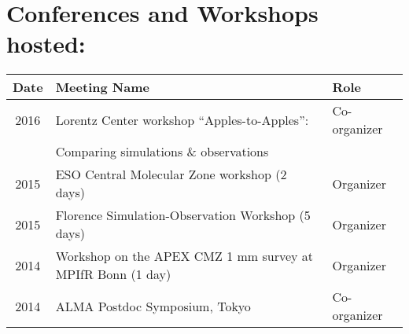 
\setlength{\extrarowheight}{0pt}
\section*{Conferences and Workshops hosted: }
\vspace{-12pt}
\begin{tabular}{cll}
    Date & Meeting Name & Role  \\
    \hline
    2016 & Lorentz Center workshop ``Apples-to-Apples'':  & Co-organizer \\
         & Comparing simulations \& observations & \\
    2015 &      ESO Central Molecular Zone workshop (2 days)   & Organizer \\
    2015 &      Florence Simulation-Observation Workshop (5 days) & Organizer \\
    2014 &      Workshop on the APEX CMZ 1 mm survey at MPIfR Bonn (1 day)   & Organizer \\
    2014 & ALMA Postdoc Symposium, Tokyo & Co-organizer \\
\end{tabular}
